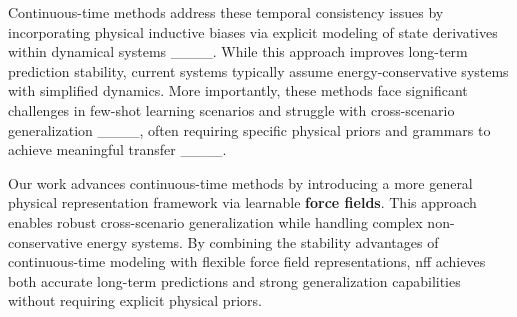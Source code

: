 Continuous-time methods address these temporal consistency issues by incorporating physical inductive biases via explicit modeling of state derivatives within dynamical systems ____. While this approach improves long-term prediction stability, current systems typically assume energy-conservative systems with simplified dynamics. More importantly, these methods face significant challenges in few-shot learning scenarios and struggle with cross-scenario generalization ____, often requiring specific physical priors and grammars to achieve meaningful transfer ____.

Our work advances continuous-time methods by introducing a more general physical representation framework via learnable \textbf{force fields}. This approach enables robust cross-scenario generalization while handling complex non-conservative energy systems. By combining the stability advantages of continuous-time modeling with flexible force field representations, \ac{nff} achieves both accurate long-term predictions and strong generalization capabilities without requiring explicit physical priors.


